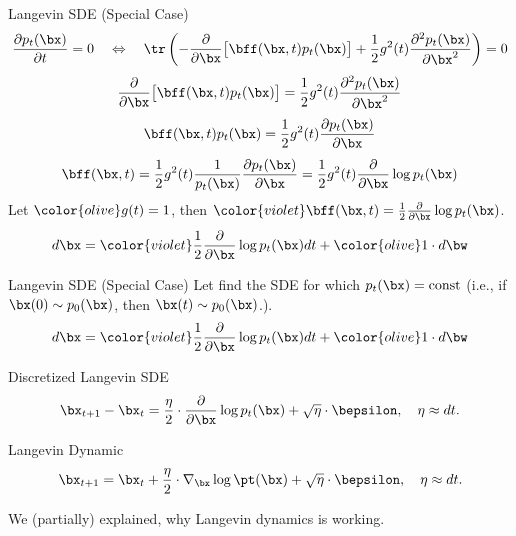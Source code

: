 \documentclass{beamer}
\begin{document}
\begin{frame}{Langevin SDE (Special Case)}
	\[
		\frac{\partial p_t(\bx)}{\partial t} = 0 \quad \Leftrightarrow \quad \tr\left( - \frac{\partial}{\partial \bx} \bigl[ \bff(\bx, t) p_t(\bx)\bigr] + \frac{1}{2} g^2(t) \frac{\partial^2 p_t(\bx)}{\partial \bx^2}\right) = 0
	\]
	\vspace{-0.3cm}
	\eqpause
	\[
		\frac{\partial}{\partial \bx} \bigl[ \bff(\bx, t) p_t(\bx)\bigr] = \frac{1}{2} g^2(t) \frac{\partial^2 p_t(\bx)}{\partial \bx^2}
	\]
	\eqpause
	\[
		\bff(\bx, t) p_t(\bx) = \frac{1}{2} g^2(t) \frac{\partial p_t(\bx)}{\partial \bx}
	\]
	\eqpause
	\[
		\bff(\bx, t) = \frac{1}{2} g^2(t) \frac{1}{p_t(\bx)}\frac{\partial p_t(\bx)}{\partial \bx} = \frac{1}{2} g^2(t) \frac{\partial}{\partial \bx} \log p_t(\bx)
	\]
	\eqpause
	Let ${\color{olive}g(t)=1}$, then ${\color{violet}\bff(\bx, t) = \frac{1}{2} \frac{\partial}{\partial \bx} \log p_t(\bx)}$.
	\[
		d \bx = {\color{violet}\frac{1}{2} \frac{\partial}{\partial \bx} \log p_t(\bx) d t} + {\color{olive}1} \cdot d \bw
	\]
\end{frame}
\begin{frame}{Langevin SDE (Special Case)}
	Let find the SDE for which $p_t(\bx) = \text{const}$ (i.e., if $\bx(0) \sim p_0(\bx)$, then $\bx(t) \sim p_0(\bx)$.).
	\[
		d \bx = {\color{violet}\frac{1}{2} \frac{\partial}{\partial \bx} \log p_t(\bx) d t} + {\color{olive}1} \cdot d \bw
	\]
	\eqpause
	\begin{block}{Discretized Langevin SDE}
		\vspace{-0.3cm}
		\[
			\bx_{t + 1} - \bx_t = \frac{\eta}{2} \cdot \frac{\partial}{\partial \bx} \log p_t(\bx) + \sqrt{\eta} \cdot \bepsilon, \quad \eta \approx dt.
		\]
		\vspace{-0.4cm}
	\end{block}
	\begin{block}{Langevin Dynamic}
		\vspace{-0.3cm}
		\[
			\bx_{t + 1} = \bx_t + \frac{\eta}{2} \cdot \nabla_{\bx} \log \pt(\bx) + \sqrt{\eta} \cdot \bepsilon, \quad \eta \approx dt.
		\]
		\vspace{-0.3cm}
	\end{block}
	We (partially) explained, why Langevin dynamics is working.
\end{frame}
\end{document}
